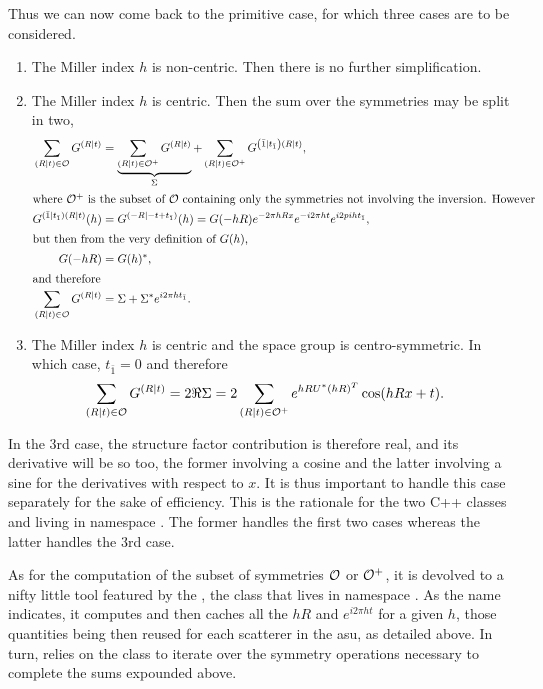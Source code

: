 \documentclass[11pt]{article}
\begin{document}
Thus we can now come back to the primitive case, for which three cases are to be considered.
\begin{enumerate}
\item The Miller index $h$ is non-centric. Then there is no further simplification.
\item The Miller index $h$ is centric. Then the sum over the symmetries may be split in two,
\begin{align}
\sum_{(R \mid t) \in \cal{O}} G^{(R \mid t)} &= 
\underbrace{\sum_{(R \mid t) \in \cal{O^+}} G^{(R \mid t)} }_{\Sigma} 
+ \sum_{(R \mid t) \in \cal{O}^+} G^{\left(\bar{1} \mid t_{\bar{1}}\right)(R \mid t)}, \nonumber \\
\intertext{where $\cal{O}^+$ is the subset of $\cal{O}$ containing only the symmetries not involving the inversion. However}
 G^{(\bar{1} \mid t_{\bar{1}})(R \mid t)}(h) &= G^{\left(-R \mid -t + t_{\bar{1}}\right)}(h) = G(-hR) e^{-2\pi hRx}
 e^{-i2\pi ht} e^{i2pi h t_{\bar{1}}}, \nonumber \\
 \intertext{but then from the very definition of $G(h)$,}
 G(-hR) &= G(h)^*, \\
 \intertext{and therefore}
 \sum_{(R \mid t) \in \cal{O}} G^{(R \mid t)} &= \Sigma + \Sigma^* e^{i2\pi h t_{\bar{1}}}.
\end{align}

\item The Miller index $h$ is centric and the space group is centro-symmetric. In which case, $t_{\bar{1}}=0$ and therefore
\begin{align}
 \sum_{(R \mid t) \in \cal{O}} G^{(R \mid t)} &= 2 \Re{\Sigma} = 2 \sum_{(R \mid t) \in \cal{O}^+}  e^{h R U^* (hR)^T} \cos(hRx + t).
\end{align}
\end{enumerate}

In the 3rd case, the structure factor contribution is therefore real, and its derivative will be so too, the former involving a cosine and the latter involving a sine for the derivatives with respect to $x$. It is thus important to handle this case separately for the sake of efficiency. This is the rationale for the two C++ classes  and  living in namespace . The former handles the first two cases whereas the latter handles the 3rd case.

As for the computation of the subset of symmetries $\cal{O}$ or $\cal{O^+}$, it is devolved to a nifty little tool featured by the , the class  that lives in namespace . As the name indicates, it computes and then caches all the $hR$ and $e^{i2\pi ht}$ for a given $h$, those quantities being then reused for each scatterer in the asu, as detailed above. In turn,  relies on the class  to iterate over the symmetry operations necessary to complete the sums expounded above. 
\end{document}
